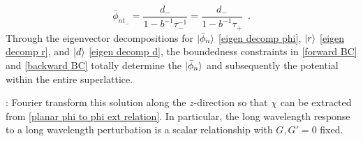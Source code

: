\begin{equation}
    \label{backward BC}
    \bar\phi_{nt_-} = \frac{d_-}{1-b^{-1}\tau_-^{-1}} = \frac{d_-}{1-b^{-1}\tau_+}
    \,\,\,.
\end{equation}
Through the eigenvector decompositions for $\lvert\bar\phi_n\rangle$ \eqref{eigen decomp phi}, $\lvert r\rangle$ \eqref{eigen decomp r}, and $\lvert d\rangle$ \eqref{eigen decomp d}, the boundedness constraints in \eqref{forward BC} and \eqref{backward BC} totally determine the $\lvert\bar\phi_n\rangle$ and subsequently the potential within the entire superlattice.

: Fourier transform this solution along the $z$-direction so that $\chi$ can be extracted from \eqref{planar phi to phi ext relation}.  In particular, the long wavelength response to a long wavelength perturbation is a scalar relationship with $G,G'=0$ fixed.
